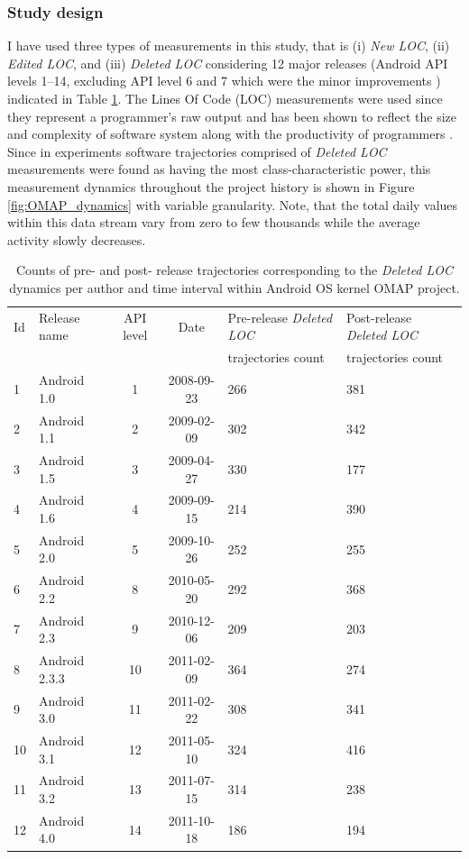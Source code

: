 \subsubsection{Study design}
I have used three types of measurements in this study, that is (i) \textit{New LOC}, (ii) \textit{Edited LOC}, and (iii) \textit{Deleted LOC} considering 12 major releases (Android API levels 1--14, excluding API level 6 and 7 which were the minor improvements \cite{api-levels}) indicated in Table \ref{android_table1}. The Lines Of Code (LOC) measurements were used since they represent a programmer's raw output and has been shown to reflect the size and complexity of software system along with the productivity of programmers  \cite{citeulike:341464} \cite{citeulike:13410945} \cite{citeulike:13410947}. Since in experiments  software trajectories comprised of \textit{Deleted LOC} measurements were found as having the most class-characteristic power, this measurement dynamics throughout the project history is shown in Figure \ref{fig:OMAP_dynamics} with variable granularity. Note, that the total daily values within this data stream vary from zero to few thousands while the average activity slowly decreases.

\begin{table}[t]
\caption{Counts of pre- and post- release trajectories corresponding to the \textit{Deleted LOC} dynamics per author and time interval within Android OS kernel OMAP project.}
\label{android_table1}
\centering
\begin{small}
\begin{tabularx}{\linewidth}{l l c c X X}
\toprule
Id &Release name & API level & Date & Pre-release \textit{Deleted LOC} & Post-release \textit{Deleted LOC}\\
& & & & trajectories count & trajectories count\\
\midrule
1 & Android 1.0    & 1 & 2008-09-23    &  266 &    381\\
2 & Android 1.1    & 2 & 2009-02-09     & 302 &    342\\
3 & Android 1.5     & 3 & 2009-04-27    & 330  &   177\\
4 & Android 1.6     & 4 & 2009-09-15    & 214  &   390\\
5 & Android 2.0     & 5 & 2009-10-26    & 252  &   255\\
6 & Android 2.2     & 8 & 2010-05-20    &  292  &   368\\
7 & Android 2.3     & 9  & 2010-12-06    &  209   &  203\\
8 & Android 2.3.3   & 10 & 2011-02-09  &   364  &   274\\
9 & Android 3.0     & 11 & 2011-02-22    &  308   &  341\\
10 & Android 3.1     & 12 & 2011-05-10    &  324 &    416\\
11 & Android 3.2     & 13 & 2011-07-15   &   314 &    238\\
12 & Android 4.0     & 14 & 2011-10-18    &  186  &   194\\
\bottomrule
\end{tabularx}
\end{small}
\end{table}

